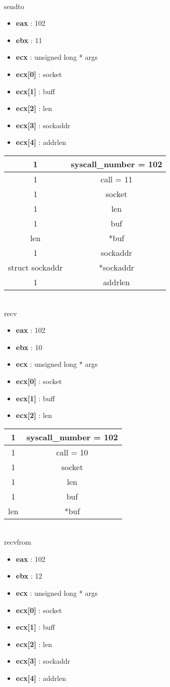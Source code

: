 \documentclass{report}
\begin{document}
\\
sendto
\begin{itemize}
\item \textbf{eax} : 102
\item \textbf{ebx} : 11
\item \textbf{ecx} : unsigned  long * args
\item \textbf{ecx[0]} : socket
\item \textbf{ecx[1]} : buff
\item \textbf{ecx[2]} : len
\item \textbf{ecx[3]} : sockaddr
\item \textbf{ecx[4]} : addrlen
\end{itemize}
\begin{tabular}{| c | c | }
\hline
1 & syscall\_number = 102 \\ \hline 
1 & call = 11 \\ \hline 
1 & socket \\ \hline 
1 & len \\ \hline 
1 & buf  \\ \hline
len & *buf  \\ \hline
1 & sockaddr  \\ \hline
struct sockaddr & *sockaddr \\ \hline
1 & addrlen  \\ \hline
\end{tabular}
\\
recv
\begin{itemize}
\item \textbf{eax} : 102
\item \textbf{ebx} : 10
\item \textbf{ecx} : unsigned  long * args
\item \textbf{ecx[0]} : socket
\item \textbf{ecx[1]} : buff
\item \textbf{ecx[2]} : len
\end{itemize}
\begin{tabular}{| c | c | }
\hline
1 & syscall\_number = 102 \\ \hline 
1 & call = 10 \\ \hline 
1 & socket \\ \hline 
1 & len \\ \hline 
1 & buf  \\ \hline
len & *buf  \\ \hline
\end{tabular}
\\
recvfrom
\begin{itemize}
\item \textbf{eax} : 102
\item \textbf{ebx} : 12
\item \textbf{ecx} : unsigned  long * args
\item \textbf{ecx[0]} : socket
\item \textbf{ecx[1]} : buff
\item \textbf{ecx[2]} : len
\item \textbf{ecx[3]} : sockaddr
\item \textbf{ecx[4]} : addrlen
\end{itemize}
\end{document}
